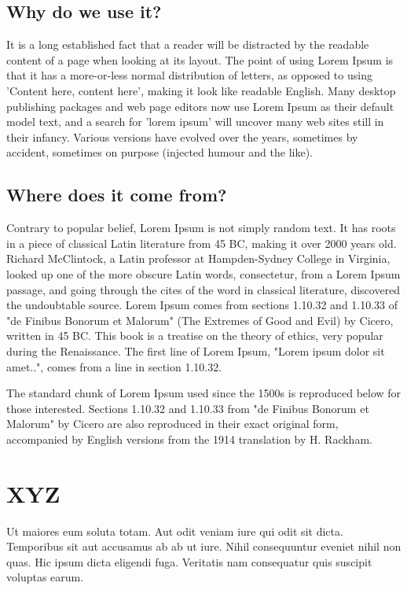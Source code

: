 \documentclass{plmmthesis}
\begin{document}
\section{Why do we use it?}
It is a long established fact that a reader will be distracted by the readable content of a page when looking at its layout. The point of using Lorem Ipsum is that it has a more-or-less normal distribution of letters, as opposed to using 'Content here, content here', making it look like readable English. Many desktop publishing packages and web page editors now use Lorem Ipsum as their default model text, and a search for 'lorem ipsum' will uncover many web sites still in their infancy. Various versions have evolved over the years, sometimes by accident, sometimes on purpose (injected humour and the like).\cite{loremipsum}


\section{Where does it come from?}
Contrary to popular belief, Lorem Ipsum is not simply random text. It has roots in a piece of classical Latin literature from 45 BC, making it over 2000 years old. Richard McClintock, a Latin professor at Hampden-Sydney College in Virginia, looked up one of the more obscure Latin words, consectetur, from a Lorem Ipsum passage, and going through the cites of the word in classical literature, discovered the undoubtable source. Lorem Ipsum comes from sections 1.10.32 and 1.10.33 of "de Finibus Bonorum et Malorum" (The Extremes of Good and Evil) by Cicero, written in 45 BC. This book is a treatise on the theory of ethics, very popular during the Renaissance. The first line of Lorem Ipsum, "Lorem ipsum dolor sit amet..", comes from a line in section 1.10.32.\cite{loremipsum}

The standard chunk of Lorem Ipsum used since the 1500s is reproduced below for those interested.
Sections 1.10.32 and 1.10.33 from "de Finibus Bonorum et Malorum" by Cicero are also reproduced in
their exact original form, accompanied by English versions from the 1914 translation by H.
Rackham.\cite{loremipsum}

\chapter{XYZ}

Ut maiores eum soluta totam. Aut odit veniam iure qui odit sit dicta. Temporibus sit aut accusamus
ab ab ut iure. Nihil consequuntur eveniet nihil non quas. Hic ipsum dicta eligendi fuga. Veritatis
nam consequatur quis suscipit voluptas earum.
\end{document}
